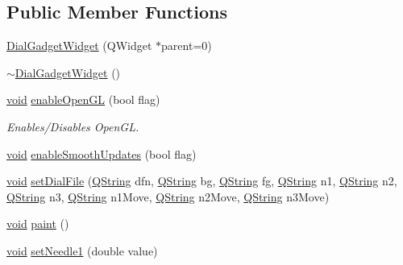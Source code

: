 \subsection*{\-Public \-Member \-Functions}
\begin{DoxyCompactItemize}
\item 
\hyperlink{group___dial_plugin_gac5397a4cc992266439aa3e8b1513c209}{\-Dial\-Gadget\-Widget} (\-Q\-Widget $\ast$parent=0)
\item 
\hyperlink{group___dial_plugin_ga3e34cc3b776a627597b4c4823b358741}{$\sim$\-Dial\-Gadget\-Widget} ()
\item 
\hyperlink{group___u_a_v_objects_plugin_ga444cf2ff3f0ecbe028adce838d373f5c}{void} \hyperlink{group___dial_plugin_gaad3e246709ada936d97644f6e87fba59}{enable\-Open\-G\-L} (bool flag)
\begin{DoxyCompactList}\small\item\em \-Enables/\-Disables \-Open\-G\-L. \end{DoxyCompactList}\item 
\hyperlink{group___u_a_v_objects_plugin_ga444cf2ff3f0ecbe028adce838d373f5c}{void} \hyperlink{group___dial_plugin_ga6b6e527e9c2516f6dec2f6332a288a9f}{enable\-Smooth\-Updates} (bool flag)
\item 
\hyperlink{group___u_a_v_objects_plugin_ga444cf2ff3f0ecbe028adce838d373f5c}{void} \hyperlink{group___dial_plugin_ga00bc4e8b1988a13cf8d1fff889444684}{set\-Dial\-File} (\hyperlink{group___u_a_v_objects_plugin_gab9d252f49c333c94a72f97ce3105a32d}{\-Q\-String} dfn, \hyperlink{group___u_a_v_objects_plugin_gab9d252f49c333c94a72f97ce3105a32d}{\-Q\-String} bg, \hyperlink{group___u_a_v_objects_plugin_gab9d252f49c333c94a72f97ce3105a32d}{\-Q\-String} fg, \hyperlink{group___u_a_v_objects_plugin_gab9d252f49c333c94a72f97ce3105a32d}{\-Q\-String} n1, \hyperlink{group___u_a_v_objects_plugin_gab9d252f49c333c94a72f97ce3105a32d}{\-Q\-String} n2, \hyperlink{group___u_a_v_objects_plugin_gab9d252f49c333c94a72f97ce3105a32d}{\-Q\-String} n3, \hyperlink{group___u_a_v_objects_plugin_gab9d252f49c333c94a72f97ce3105a32d}{\-Q\-String} n1\-Move, \hyperlink{group___u_a_v_objects_plugin_gab9d252f49c333c94a72f97ce3105a32d}{\-Q\-String} n2\-Move, \hyperlink{group___u_a_v_objects_plugin_gab9d252f49c333c94a72f97ce3105a32d}{\-Q\-String} n3\-Move)
\item 
\hyperlink{group___u_a_v_objects_plugin_ga444cf2ff3f0ecbe028adce838d373f5c}{void} \hyperlink{group___dial_plugin_gab6b769564974c0549228d13820ced8e7}{paint} ()
\item 
\hyperlink{group___u_a_v_objects_plugin_ga444cf2ff3f0ecbe028adce838d373f5c}{void} \hyperlink{group___dial_plugin_gaab89c42817209c3b41a9f407138b2c2f}{set\-Needle1} (double value)

\end{DoxyCompactItemize}
